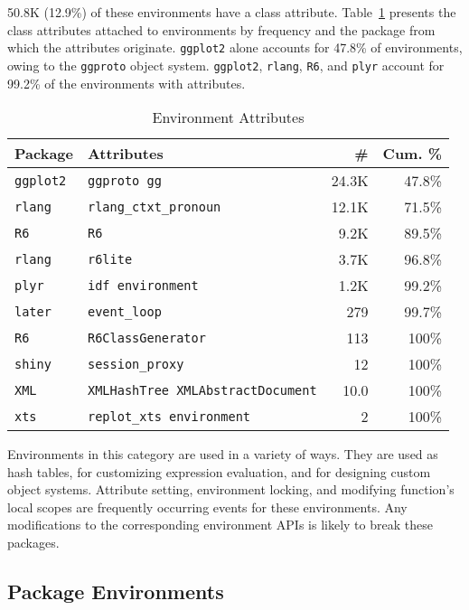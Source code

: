 \documentclass[10pt,review,sigplan,anonymous=true,authorversion=true,nonacm=true]{acmart}
\newcommand{\code}[1]{\lstinline |#1|\xspace}
\begin{document}
50.8K (12.9\%) of these environments have a class attribute.
Table~\ref{table:explicit_env_attr} presents the class attributes attached to
environments by frequency and the package from which the attributes originate.
\code{ggplot2} alone accounts for 47.8\% of environments, owing to the
\code{ggproto} object system. \code{ggplot2}, \code{rlang}, \code{R6}, and
\code{plyr} account for 99.2\% of the environments with attributes.
\begin{table}[!h]
  \small
  \caption{Environment Attributes} \label{table:explicit_env_attr}
  \centering
  \begin{tabular}{@{}ll@{}rr@{}}
    \toprule
    \textbf{Package}&\textbf{Attributes}&\textbf{\#}&\textbf{Cum. \%}\\
    \midrule
    \texttt{ggplot2}&\texttt{ggproto gg}&24.3K&47.8\%\\
    \texttt{rlang}&\texttt{rlang\_ctxt\_pronoun}&12.1K&71.5\%\\
    \texttt{R6}&\texttt{R6}&9.2K&89.5\%\\
    \texttt{rlang}&\texttt{r6lite}&3.7K&96.8\%\\
    \texttt{plyr}&\texttt{idf environment}&1.2K&99.2\%\\
    \texttt{later}&\texttt{event\_loop}&279&99.7\%\\
    \texttt{R6}&\texttt{R6ClassGenerator}&113&100\%\\
    \texttt{shiny}&\texttt{session\_proxy}&12&100\%\\
    \texttt{XML}&\texttt{XMLHashTree XMLAbstractDocument}&10.0&100\%\\
    \texttt{xts}&\texttt{replot\_xts environment}&2&100\%\\
    \bottomrule
  \end{tabular}
\end{table}

Environments in this category are used in a variety of ways. They are used as
hash tables, for customizing expression evaluation, and for designing custom
object systems. Attribute setting, environment locking, and modifying function's
local scopes are frequently occurring events for these environments. Any
modifications to the corresponding environment APIs is likely to break these
packages.


\subsection{Package Environments}
\end{document}
